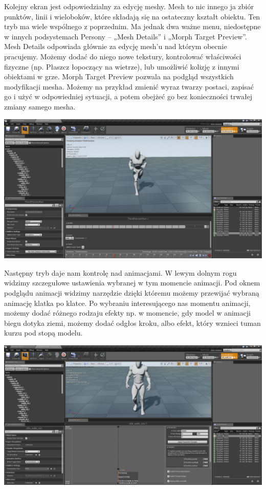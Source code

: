 \documentclass[brudnopis]{xmgr}
\begin{document}
Kolejny ekran jest odpowiedzialny za edycję meshy. Mesh to nic innego ja zbiór punktów, linii i wieloboków, które składają się na ostateczny kształt obiektu.
Ten tryb ma wiele wspólnego z poprzednim. Ma jednak dwa ważne menu, niedostępne w innych podsystemach Persony – „Mesh Details” i „Morph Target Preview”.
Mesh Details odpowiada głównie za edycję mesh’u nad którym obecnie pracujemy. Możemy dodać do niego nowe tekstury, kontrolować właściwości fizyczne (np. Płaszcz łopoczący na wietrze), lub umożliwić kolizję z innymi obiektami w grze.
Morph Target Preview pozwala na podgląd wszystkich modyfikacji mesha. Możemy na przykład zmienić wyraz twarzy postaci, zapisać go i użyć w odpowiedniej sytuacji, a potem obejżeć go bez konieczności trwałej zmiany samego mesha.

\includegraphics[scale=0.25]{Screeny/Animation}

Następny tryb daje nam kontrolę nad animacjami. W lewym dolnym rogu widzimy szczegułowe ustawienia wybranej w tym momencie animacji.
Pod oknem podglądu animacji widzimy narzędzie dzięki któremu możemy przewijać wybraną animację klatka po klatce. Po wybraniu interesującego nas momentu animacji, możemy dodać różnego rodzaju efekty np. w momencie, gdy model w animacji biegu dotyka ziemi, możemy dodać odgłos kroku, albo efekt, który wznieci tuman kurzu pod stopą modelu.

\includegraphics[scale=0.25]{Screeny/Blend_Space}
\end{document}
